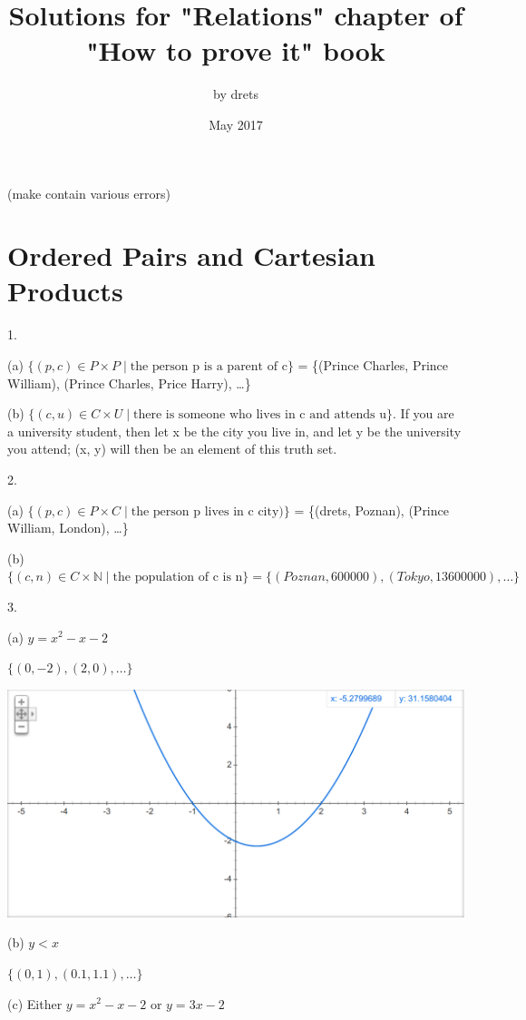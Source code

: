 \documentclass{article}
\title{Solutions for "Relations" chapter of "How to prove it" book}
\author{
    by drets\\
}
\date{May 2017}
\newcommand{\vs}{\vspace{30pt}}
\begin{document}
\maketitle

\centerline{(make contain various errors)}

\section{Ordered Pairs and Cartesian Products}

1.

(a) $\{(p, c) \in P \times P \mid \text{the person p is a parent of c}\}$ = \{(Prince Charles, Prince William), (Prince Charles, Price Harry), \dots\}

(b) $\{(c, u) \in C \times U \mid \text{there is someone who lives in c and attends u}\}$. If you are a university student, then let x be the city you live in, and let y be the university you attend; (x, y) will then be an element of this truth set.
\vs

2.

(a) $\{(p, c) \in P \times C \mid \text{the person p lives in c city})\}$ = \{(drets, Poznan), (Prince William, London), \dots\}

(b) $\{(c, n) \in C \times \mathbb{N} \mid \text{the population of c is n}\} = \{(Poznan, 600000), (Tokyo, 13600000), \dots\}$
\vs

3.

(a) $y = x^2 - x - 2$

$\{(0, -2), (2, 0), \dots\}$

\includegraphics[width=\textwidth,height=\textheight,keepaspectratio]{misc/4_1_3_1}
\vs

(b) $y < x$

$\{(0,1), (0.1, 1.1), \dots\}$
\vs

(c) Either $y = x^2 - x - 2$ or $y = 3x - 2$
\end{document}

